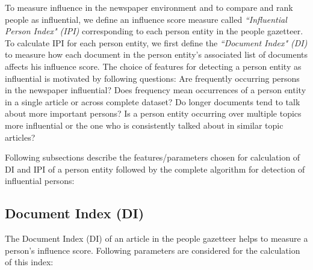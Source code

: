 To measure influence in the newspaper environment and to compare and rank people as influential, we define an influence score measure called \textit{``Influential Person Index" (IPI)} corresponding to each person entity in the people gazetteer. To calculate IPI for each person entity, we first define the \textit{``Document Index" (DI)} to measure how each document in the person entity's associated list of documents affects his influence score.
The choice of features for detecting a person entity as influential is motivated by following questions: Are frequently occurring persons in the newspaper influential? Does frequency mean occurrences of a person entity in a single article or across complete dataset? Do longer documents tend to talk about more important persons? Is a person entity occurring over multiple topics more influential or the one who is consistently talked about in similar topic articles? 

Following subsections describe the features/parameters chosen for calculation of DI and IPI of a person entity followed by the complete algorithm for detection of influential persons:

\subsection{Document Index (DI)}
\label{influential:DI}
The Document Index (DI) of an article in the people gazetteer helps to measure a person's influence score. Following parameters are considered for the calculation of this index:

